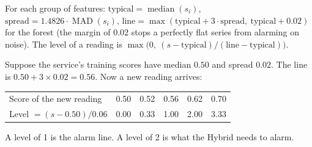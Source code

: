 \begin{techbox}
For each group of features: $\text{typical}=\operatorname{median}(s_i)$, $\text{spread}=1.4826\cdot\operatorname{MAD}(s_i)$, $\text{line}=\max(\text{typical}+3\cdot\text{spread},\ \text{typical}+0.02)$ for the forest (the margin of $0.02$ stops a perfectly flat series from alarming on noise). The level of a reading is $\max\bigl(0,\ (s-\text{typical})/(\text{line}-\text{typical})\bigr)$.
\end{techbox}

\begin{examplebox}
Suppose the service's training scores have median $0.50$ and spread $0.02$. The line is $0.50+3\times0.02=0.56$. Now a new reading arrives:

\begin{center}
\small
\begin{tabular}{lccccc}
\toprule
Score of the new reading & 0.50 & 0.52 & 0.56 & 0.62 & 0.70\\
Level $=(s-0.50)/0.06$ & 0.00 & 0.33 & 1.00 & 2.00 & 3.33\\
\bottomrule
\end{tabular}
\end{center}
A level of 1 is the alarm line. A level of 2 is what the Hybrid needs to alarm.
\end{examplebox}

